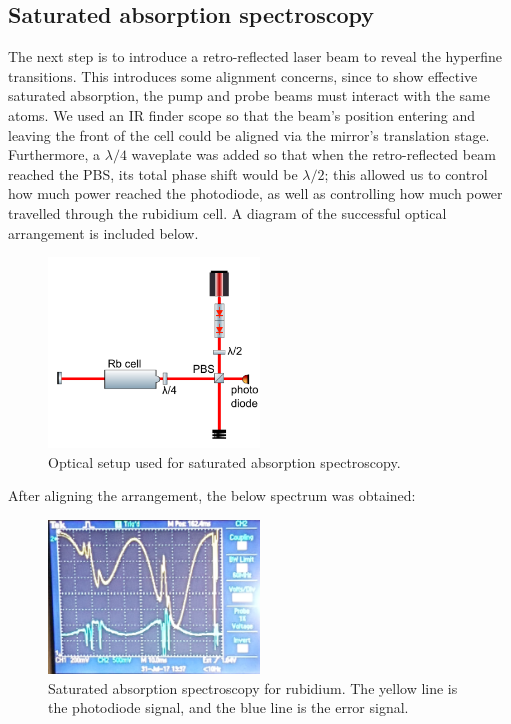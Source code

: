 \documentclass[11pt,twoside,a4paper]{article}
\begin{document}
\subsection{Saturated absorption spectroscopy}
The next step is to introduce a retro-reflected laser beam to reveal the hyperfine transitions. This introduces some alignment concerns, since to show effective saturated absorption, the pump
and probe beams must interact with the same atoms. We used an IR finder scope so that the beam's position entering and leaving the front of the cell could be aligned via the mirror's translation
stage. Furthermore, a \(\lambda/4\) waveplate was added so that when the retro-reflected beam reached the PBS, its total phase shift would be \(\lambda/2\); this allowed us to control how much
power reached the photodiode, as well as controlling how much power travelled through the rubidium cell. A diagram of the successful optical arrangement is included below.
\begin{figure}[h]
    \centering
    \includegraphics[width=0.5\textwidth]{images/satabs-setup}
    \caption{Optical setup used for saturated absorption spectroscopy.}
\end{figure}

After aligning the arrangement, the below spectrum was obtained:
\begin{figure}[h]
    \centering
    \includegraphics[width=0.5\textwidth]{images/satabs-shit-error}
    \caption{Saturated absorption spectroscopy for rubidium. The yellow line is the photodiode signal, and the blue line is the error signal.}
\end{figure}
\end{document}
